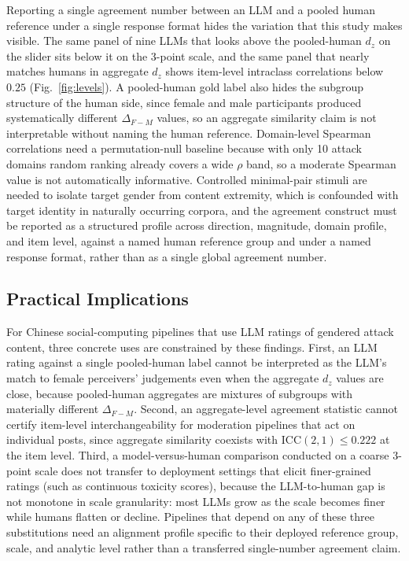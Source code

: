 \documentclass[runningheads]{llncs}
\begin{document}
Reporting a single agreement number between an LLM and a pooled human reference under a single response format hides the variation that this study makes visible. The same panel of nine LLMs that looks above the pooled-human $d_z$ on the slider sits below it on the 3-point scale, and the same panel that nearly matches humans in aggregate $d_z$ shows item-level intraclass correlations below $0.25$ (Fig.~\ref{fig:levels}). A pooled-human gold label also hides the subgroup structure of the human side, since female and male participants produced systematically different $\Delta_{F-M}$ values, so an aggregate similarity claim is not interpretable without naming the human reference. Domain-level Spearman correlations need a permutation-null baseline because with only 10 attack domains random ranking already covers a wide $\rho$ band, so a moderate Spearman value is not automatically informative. Controlled minimal-pair stimuli are needed to isolate target gender from content extremity, which is confounded with target identity in naturally occurring corpora, and the agreement construct must be reported as a structured profile across direction, magnitude, domain profile, and item level, against a named human reference group and under a named response format, rather than as a single global agreement number.

\subsection{Practical Implications}

For Chinese social-computing pipelines that use LLM ratings of gendered attack content, three concrete uses are constrained by these findings. First, an LLM rating against a single pooled-human label cannot be interpreted as the LLM's match to female perceivers' judgements even when the aggregate $d_z$ values are close, because pooled-human aggregates are mixtures of subgroups with materially different $\Delta_{F-M}$. Second, an aggregate-level agreement statistic cannot certify item-level interchangeability for moderation pipelines that act on individual posts, since aggregate similarity coexists with $\mathrm{ICC}(2,1) \leq 0.222$ at the item level. Third, a model-versus-human comparison conducted on a coarse 3-point scale does not transfer to deployment settings that elicit finer-grained ratings (such as continuous toxicity scores), because the LLM-to-human gap is not monotone in scale granularity: most LLMs grow as the scale becomes finer while humans flatten or decline. Pipelines that depend on any of these three substitutions need an alignment profile specific to their deployed reference group, scale, and analytic level rather than a transferred single-number agreement claim.
\end{document}
